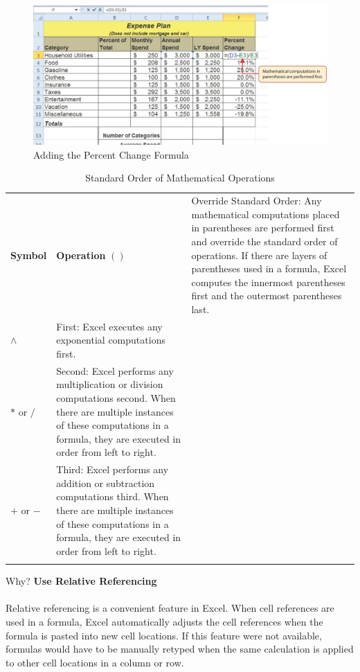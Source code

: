 \begin{figure}[H]
	\centering
	\includegraphics[width=\maxwidth{.95\linewidth}]{gfx/ch02_fig06}
	\caption{Adding the Percent Change Formula}
	\label{02:fig06}
\end{figure}

\begin{table}[H]
	{\small
		\begin{longtable}{C{0.50in}L{3.75in}} %
			\textbf{Symbol} & \textbf{Operation} \endhead
			\hline
			$ () $ & Override Standard Order: Any mathematical computations placed in parentheses are performed first and override the standard order of operations. If there are layers of parentheses used in a formula, Excel computes the innermost parentheses first and the outermost parentheses last.\\
			$ \wedge $ & First: Excel executes any exponential computations first.\\
			$ * $ or $ / $ & Second: Excel performs any multiplication or division computations second. When there are multiple instances of these 	computations in a formula, they are executed in order from left to right.\\
			$ + $ or $ - $ & Third: Excel performs any addition or subtraction computations third. When there are multiple instances of these 	computations in a formula, they are executed in order from left to right.\\
			\caption{Standard Order of Mathematical Operations}
			\label{02:tab03}
		\end{longtable}
	} %
\end{table}

\begin{center}
	\begin{infobox}{Why?}
		\textbf{Use Relative Referencing}
		\\
		\\
		Relative referencing is a convenient feature in Excel. When cell references are used in a formula, Excel automatically adjusts the cell references when the formula is pasted into new cell locations. If this feature were not available, formulas would have to be manually retyped when the same calculation is applied to other cell locations in a column or row.
	\end{infobox}
\end{center}

